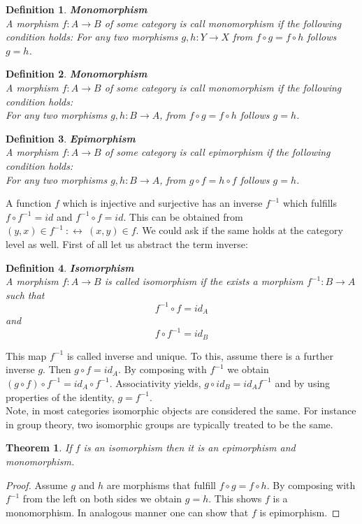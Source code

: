 \documentclass[17pt]{extarticle}
\newtheorem{theorem}{Theorem}[section]
\newtheorem{definition}{Definition}
\begin{document}
\begin{definition}
	\textbf{Monomorphism}\\
	A morphism $f:A\rightarrow B$ of some category is call monomorphism if the following condition holds:
	For any two morphisms $g,h:Y\rightarrow X$ from $f\circ g=f\circ h$ follows $g=h$.	
\end{definition}


\begin{definition}
	\textbf{Monomorphism}\\
	A morphism $f:A\rightarrow B$ of some category is call monomorphism if the following condition holds:\\
	For any two morphisms $g,h:B\rightarrow A$, from $f\circ g=f\circ h$ follows $g=h$.	
\end{definition}

\begin{definition}
	\textbf{Epimorphism}\\
	A morphism $f:A\rightarrow B$ of some category is call epimorphism if the following condition holds:\\
	For any two morphisms $g,h:B\rightarrow A$, from $g\circ f=h\circ f$ follows $g=h$.	
\end{definition}

A function $f$ which is injective and surjective has an inverse $f^{-1}$ which fulfills $f\circ f^{-1}=id$ and $f^{-1}\circ f=id$. This can be obtained from $(y,x)\in f^{-1} \ :\leftrightarrow \ (x,y)\in f$. We could ask if the same holds at the category level as well.
First of all let us abstract the term inverse:

\begin{definition}
	\textbf{Isomorphism}\\
	A morphism $f:A\rightarrow B$ is called isomorphism if the exists a morphism $f^{-1}:B\rightarrow A$ such that
	$$f^{-1}\circ f=id_A$$
	and
	$$f\circ f^{-1}=id_B$$	
\end{definition}
This map $f^{-1}$ is called inverse and unique. To this, assume there is a further inverse $g$.
Then $g\circ f=id_A$. By composing with $f^{-1}$ we obtain $(g\circ f)\circ f^{-1}=id_A\circ f^{-1}$.
Associativity yields, $g\circ id_B=id_A f^{-1}$ and by using properties of the identity, $g=f^{-1}$.\\
Note, in most categories isomorphic objects are considered the same. For instance in group theory, two isomorphic groups are typically treated to be the same.

\begin{theorem}
	If $f$ is an isomorphism then it is an epimorphism and monomorphism.
\end{theorem}
\begin{proof}
	Assume $g$ and $h$ are morphisms that fulfill $f\circ g=f\circ h$. By composing with $f^{-1}$ from the left on
	both sides we obtain $g=h$. This shows $f$ is a monomorphism. In analogous manner one can show that $f$
	is epimorphism.
\end{proof}
\end{document}
